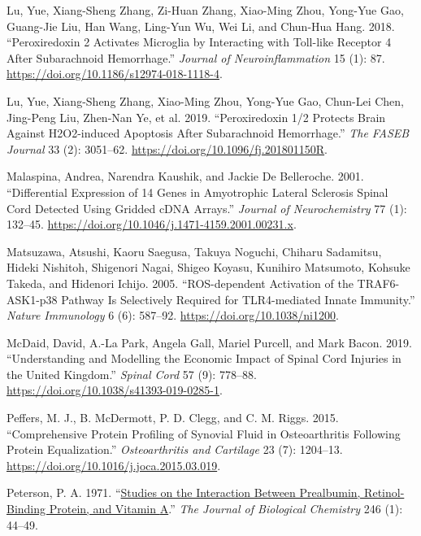 \documentclass[9pt,lineno]{elife}
\newlength{\cslhangindent}
\newlength{\cslentryspacingunit} %
\newenvironment{CSLReferences}[2] %
 {%
  \setlength{\parindent}{0pt}
  \ifodd #1
  \let\oldpar\par
  \def\par{\hangindent=\cslhangindent\oldpar}
  \fi
  \setlength{\parskip}{#2\cslentryspacingunit}
 }%
 {}
\begin{document}
\begin{landscape}
\begin{landscape}
\begin{CSLReferences}{1}{0}
\leavevmode{}%
Lu, Yue, Xiang-Sheng Zhang, Zi-Huan Zhang, Xiao-Ming Zhou, Yong-Yue Gao, Guang-Jie Liu, Han Wang, Ling-Yun Wu, Wei Li, and Chun-Hua Hang. 2018. {``Peroxiredoxin 2 Activates Microglia by Interacting with {Toll-like} Receptor 4 After Subarachnoid Hemorrhage.''} \emph{Journal of Neuroinflammation} 15 (1): 87. \url{https://doi.org/10.1186/s12974-018-1118-4}.

\leavevmode{}%
Lu, Yue, Xiang-Sheng Zhang, Xiao-Ming Zhou, Yong-Yue Gao, Chun-Lei Chen, Jing-Peng Liu, Zhen-Nan Ye, et al. 2019. {``Peroxiredoxin 1/2 Protects Brain Against {H2O2-induced} Apoptosis After Subarachnoid Hemorrhage.''} \emph{The FASEB Journal} 33 (2): 3051--62. \url{https://doi.org/10.1096/fj.201801150R}.

\leavevmode{}%
Malaspina, Andrea, Narendra Kaushik, and Jackie De Belleroche. 2001. {``Differential Expression of 14 Genes in Amyotrophic Lateral Sclerosis Spinal Cord Detected Using Gridded {cDNA} Arrays.''} \emph{Journal of Neurochemistry} 77 (1): 132--45. \url{https://doi.org/10.1046/j.1471-4159.2001.00231.x}.

\leavevmode{}%
Matsuzawa, Atsushi, Kaoru Saegusa, Takuya Noguchi, Chiharu Sadamitsu, Hideki Nishitoh, Shigenori Nagai, Shigeo Koyasu, Kunihiro Matsumoto, Kohsuke Takeda, and Hidenori Ichijo. 2005. {``{ROS-dependent} Activation of the {TRAF6-ASK1-p38} Pathway Is Selectively Required for {TLR4-mediated} Innate Immunity.''} \emph{Nature Immunology} 6 (6): 587--92. \url{https://doi.org/10.1038/ni1200}.

\leavevmode{}%
McDaid, David, A.-La Park, Angela Gall, Mariel Purcell, and Mark Bacon. 2019. {``Understanding and Modelling the Economic Impact of Spinal Cord Injuries in the {United Kingdom}.''} \emph{Spinal Cord} 57 (9): 778--88. \url{https://doi.org/10.1038/s41393-019-0285-1}.

\leavevmode{}%
Peffers, M. J., B. McDermott, P. D. Clegg, and C. M. Riggs. 2015. {``Comprehensive Protein Profiling of Synovial Fluid in Osteoarthritis Following Protein Equalization.''} \emph{Osteoarthritis and Cartilage} 23 (7): 1204--13. \url{https://doi.org/10.1016/j.joca.2015.03.019}.

\leavevmode{}%
Peterson, P. A. 1971. {``\href{https://www.ncbi.nlm.nih.gov/pubmed/5541771}{Studies on the Interaction Between Prealbumin, Retinol-Binding Protein, and Vitamin {A}}.''} \emph{The Journal of Biological Chemistry} 246 (1): 44--49.


\end{CSLReferences}
\end{landscape}
\end{landscape}
\end{document}
